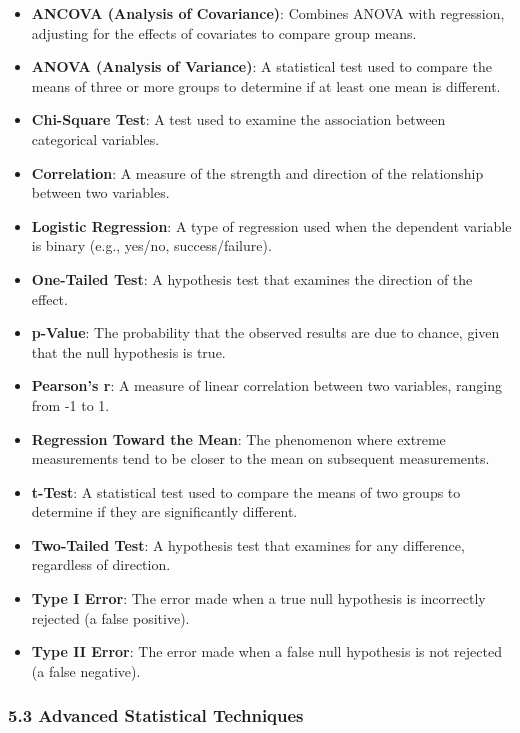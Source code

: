 \documentclass[
]{book}
\providecommand{\tightlist}{%
  \setlength{\itemsep}{0pt}\setlength{\parskip}{0pt}}
\begin{document}
\begin{itemize}
\tightlist
\item
  \textbf{ANCOVA (Analysis of Covariance)}: Combines ANOVA with regression, adjusting for the effects of covariates to compare group means.
\item
  \textbf{ANOVA (Analysis of Variance)}: A statistical test used to compare the means of three or more groups to determine if at least one mean is different.
\item
  \textbf{Chi-Square Test}: A test used to examine the association between categorical variables.
\item
  \textbf{Correlation}: A measure of the strength and direction of the relationship between two variables.
\item
  \textbf{Logistic Regression}: A type of regression used when the dependent variable is binary (e.g., yes/no, success/failure).
\item
  \textbf{One-Tailed Test}: A hypothesis test that examines the direction of the effect.
\item
  \textbf{p-Value}: The probability that the observed results are due to chance, given that the null hypothesis is true.
\item
  \textbf{Pearson's r}: A measure of linear correlation between two variables, ranging from -1 to 1.
\item
  \textbf{Regression Toward the Mean}: The phenomenon where extreme measurements tend to be closer to the mean on subsequent measurements.
\item
  \textbf{t-Test}: A statistical test used to compare the means of two groups to determine if they are significantly different.
\item
  \textbf{Two-Tailed Test}: A hypothesis test that examines for any difference, regardless of direction.
\item
  \textbf{Type I Error}: The error made when a true null hypothesis is incorrectly rejected (a false positive).
\item
  \textbf{Type II Error}: The error made when a false null hypothesis is not rejected (a false negative).
\end{itemize}

\subsubsection*{\texorpdfstring{\textbf{5.3 Advanced Statistical Techniques}}{5.3 Advanced Statistical Techniques}}\label{advanced-statistical-techniques}
\end{document}
